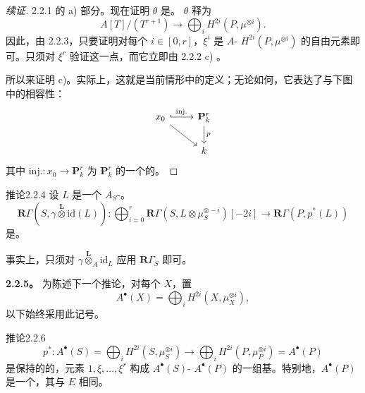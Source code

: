 \begin{proof}[续证]
 2.2.1 的 a) 部分。现在证明 $\theta$ 是。 $\theta$ 释为
\[
 A[T]/(T^{r+1})\longrightarrow\bigoplus_iH^{2i}(P,\mu^{\otimes i}).
\]
因此，由 2.2.3，只要证明对每个 $i\in[0,r]$，$\xi^i$ 是 $A$- $H^{2i}(P,\mu^{\otimes i})$ 的自由元素即可。只须对 $\xi^r$ 验证这一点，而它立即由 2.2.2 c) 。

所以来证明 c)。实际上，这就是当前情形中的定义；无论如何，它表达了与下图中的相容性：
\[
\begin{tikzcd}
 x_0 \arrow[r,hook,"\mathrm{inj.}"] \arrow[dr] & \mathbf P_k^r \arrow[d,"p"]\\
 & k
\end{tikzcd}
\]
其中 $\mathrm{inj.}:x_0\to\mathbf P_k^r$ 为 $\mathbf P_k^r$ 的一个的。
\end{proof}

\begin{SGAresult}{推论}{2.2.4}
设 $L$ 是一个 $A_S$-。
\[
 \mathbf R\Gamma(S,\gamma\mathbin{\overset{\mathbf L}{\otimes}}\mathrm{id}(L)):
 \bigoplus_{i=0}^r\mathbf R\Gamma(S,L\otimes\mu_S^{\otimes-i})[-2i]
 \longrightarrow\mathbf R\Gamma(P,p^*(L))
\]
是。
\end{SGAresult}
事实上，只须对 $\gamma\mathbin{\overset{\mathbf L}{\otimes}}_{A}\mathrm{id}_L$ 应用 $\mathbf R\Gamma_S$ 即可。

\textbf{2.2.5。} 为陈述下一个推论，对每个 $X$，置
\[
 A^\bullet(X)=\bigoplus_iH^{2i}(X,\mu_X^{\otimes i}),
\]
以下始终采用此记号。

\begin{SGAresult}{推论}{2.2.6}
\[
 p^*:A^\bullet(S)=\bigoplus_iH^{2i}(S,\mu_S^{\otimes i})
 \longrightarrow\bigoplus_iH^{2i}(P,\mu_P^{\otimes i})=A^\bullet(P)
\]
是保持的的，元素 $1,\xi,\ldots,\xi^r$ 构成 $A^\bullet(S)$- $A^\bullet(P)$ 的一组基。特别地，$A^\bullet(P)$ 是一个，其与 $E$ 相同。
\end{SGAresult}

